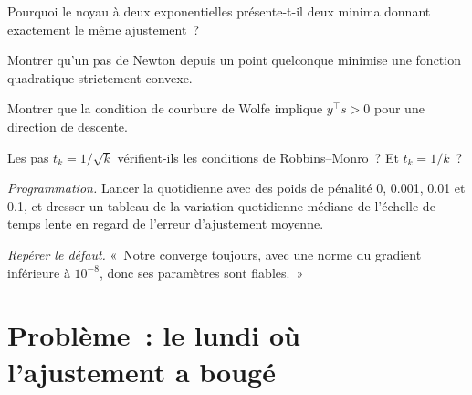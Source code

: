 \begin{exercise}[$\star$]\label{exo:qm:numerical-optimisation-in-practice:3}
Pourquoi le noyau à deux exponentielles présente-t-il deux minima donnant exactement le même ajustement~?
\end{exercise}

\begin{exercise}[$\star\star$]\label{exo:qm:numerical-optimisation-in-practice:4}
Montrer qu'un pas de Newton depuis un point quelconque minimise une fonction quadratique strictement convexe.
\end{exercise}

\begin{exercise}[$\star\star$]\label{exo:qm:numerical-optimisation-in-practice:5}
Montrer que la condition de courbure de Wolfe implique $y^\top s > 0$ pour une direction de descente.
\end{exercise}

\begin{exercise}[$\star\star$]\label{exo:qm:numerical-optimisation-in-practice:6}
Les pas $t_k = 1/\sqrt k$ vérifient-ils les conditions de Robbins--Monro~? Et $t_k = 1/k$~?
\end{exercise}

\begin{exercise}[$\star\star\star$]\label{exo:qm:numerical-optimisation-in-practice:7}
\emph{Programmation.} Lancer la  quotidienne avec des poids de pénalité 0, 0.001, 0.01 et 0.1, et dresser un tableau de la variation quotidienne médiane de l'échelle de temps lente en regard de l'erreur d'ajustement moyenne.
\end{exercise}

\begin{exercise}[$\star\star\star$]\label{exo:qm:numerical-optimisation-in-practice:8}
\emph{Repérer le défaut.} «~Notre  converge toujours, avec une norme du gradient inférieure à $10^{-8}$, donc ses paramètres sont fiables.~»
\end{exercise}

\section{Problème~: le lundi où l'ajustement a bougé}

